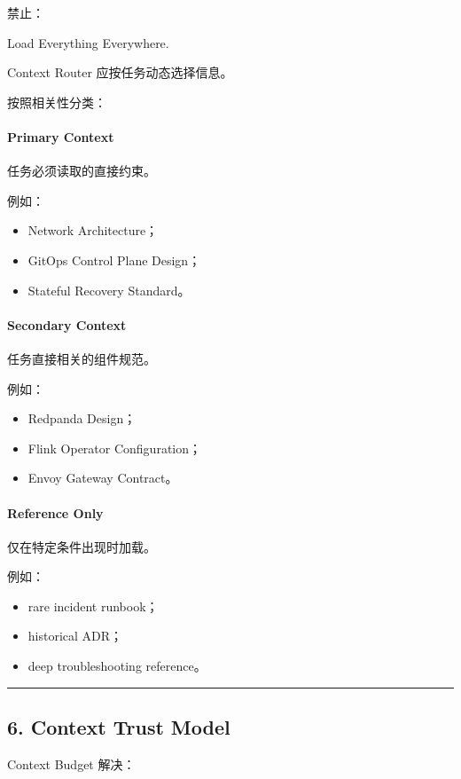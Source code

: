 \documentclass[11pt,a4paper]{article}
\begin{document}
禁止：

\begin{gfmBlockquote}
Load Everything Everywhere.
\end{gfmBlockquote}
Context Router 应按任务动态选择信息。

按照相关性分类：

\paragraph{Primary Context}
任务必须读取的直接约束。

例如：

\begin{itemize}
  \item Network Architecture；
  \item GitOps Control Plane Design；
  \item Stateful Recovery Standard。
\end{itemize}
\paragraph{Secondary Context}
任务直接相关的组件规范。

例如：

\begin{itemize}
  \item Redpanda Design；
  \item Flink Operator Configuration；
  \item Envoy Gateway Contract。
\end{itemize}
\paragraph{Reference Only}
仅在特定条件出现时加载。

例如：

\begin{itemize}
  \item rare incident runbook；
  \item historical ADR；
  \item deep troubleshooting reference。
\end{itemize}
\vspace{0.5em}\hrule\vspace{0.5em}
\subsection{6. Context Trust Model}
Context Budget 解决：
\end{document}

